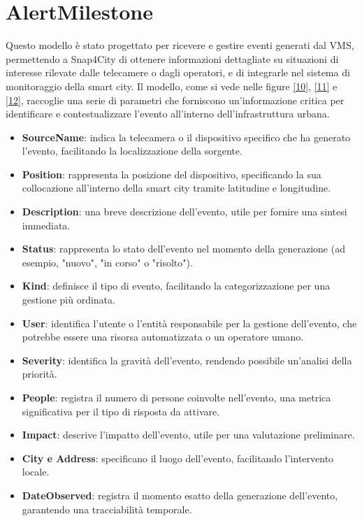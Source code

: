 \documentclass[a4paper, openright, thesis]{report}
\begin{document}
\section{AlertMilestone} \label{alertmilestone}
Questo modello è stato progettato per ricevere e gestire eventi generati dal VMS, permettendo a Snap4City di ottenere informazioni dettagliate su situazioni di interesse rilevate dalle telecamere o dagli operatori, e di integrarle nel sistema di monitoraggio della smart city. Il modello, come si vede nelle figure \ref{10}, \ref{11} e \ref{12}, raccoglie una serie di parametri che forniscono un'informazione critica per identificare e contestualizzare l'evento all'interno dell'infrastruttura urbana.
\begin{itemize}
\item\textbf{SourceName}: indica la telecamera o il dispositivo specifico che ha generato l'evento, facilitando la localizzazione della sorgente.
\item\textbf{Position}: rappresenta la posizione del dispositivo, specificando la sua collocazione all'interno della smart city tramite latitudine e longitudine.
\item\textbf{Description}: una breve descrizione dell'evento, utile per fornire una sintesi immediata.
\item\textbf{Status}: rappresenta lo stato dell’evento nel momento della generazione (ad esempio, "nuovo", "in corso" o "risolto").
\item\textbf{Kind}: definisce il tipo di evento, facilitando la categorizzazione per una gestione più ordinata.
\item\textbf{User}: identifica l'utente o l'entità responsabile per la gestione dell'evento, che potrebbe essere una risorsa automatizzata o un operatore umano.
\item\textbf{Severity}: identifica la gravità dell'evento, rendendo possibile un'analisi della priorità.
\item\textbf{People}: registra il numero di persone coinvolte nell'evento, una metrica significativa per il tipo di risposta da attivare.
\item\textbf{Impact}: descrive l'impatto dell'evento, utile per una valutazione preliminare.
\item\textbf{City e Address}: specificano il luogo dell’evento, facilitando l’intervento locale.
\item\textbf{DateObserved}: registra il momento esatto della generazione dell’evento, garantendo una tracciabilità temporale.
\end{itemize}
\end{document}
